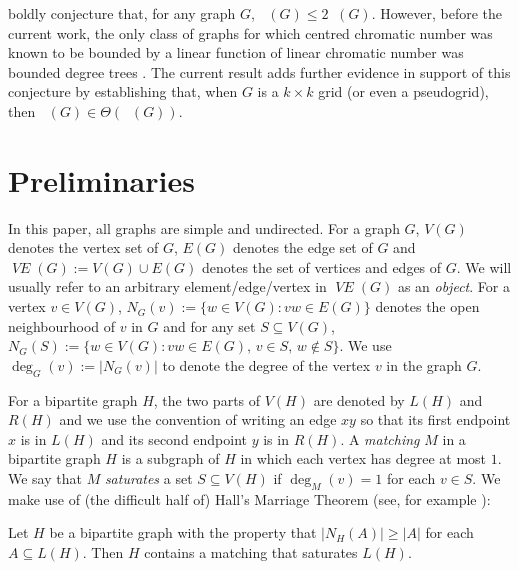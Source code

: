\documentclass{patmorin}
\newcommand{\defin}[1]{\emph{\color{brightmaroon}#1}}
\DeclareMathOperator{\chicen}{\chi_{\mathrm{cen}}}
\DeclareMathOperator{\chilin}{\chi_{\mathrm{lin}}}
\DeclareMathOperator{\VE}{\mathit{VE}}
\begin{document}

\citet{kun.obrien.ea:polynomial} boldly conjecture that, for any graph $G$, $\chicen(G)\le 2\chilin(G)$.  However, before the current work, the only class of graphs for which centred chromatic number was known to be bounded by a linear function of linear chromatic number was bounded degree trees \cite[Theorem~4]{kun.obrien.ea:polynomial}.  The current result adds further evidence in support of this conjecture by establishing that, when $G$ is a $k\times k$ grid (or even a pseudogrid), then $\chicen(G)\in\Theta(\chilin(G))$.

\section{Preliminaries}

In this paper, all graphs are simple and undirected. For a graph $G$, $V(G)$ denotes the vertex set of $G$, $E(G)$ denotes the edge set of $G$ and $\VE(G):=V(G)\cup E(G)$ denotes the set of vertices and edges of $G$. We will usually refer to an arbitrary element/edge/vertex in $\VE(G)$ as an \defin{object}. For a vertex $v\in V(G)$,  $N_G(v):=\{w\in V(G):vw\in E(G)\}$  denotes the open neighbourhood of $v$ in $G$ and for any set $S\subseteq V(G)$, $N_G(S):=\{w\in V(G):vw\in E(G),\, v\in S,\, w\not\in S\}$.  We use $\deg_G(v):=|N_G(v)|$ to denote the degree of the vertex $v$ in the graph $G$.

For a  bipartite graph $H$, the two parts of $V(H)$ are denoted by $L(H)$ and $R(H)$ and we use the convention of writing an edge $xy$ so that its first endpoint $x$ is in $L(H)$ and its second endpoint $y$ is in $R(H)$.  A \defin{matching} $M$ in a bipartite graph $H$ is a subgraph of $H$ in which each vertex has degree at most $1$.  We say that $M$ \defin{saturates} a set $S\subseteq V(H)$ if $\deg_M(v)=1$ for each $v\in S$.  We make use of (the difficult half of) Hall's Marriage Theorem (see, for example \citet[Theorem~2.1.2]{diestel:graph}):

\begin{thm}\label{hall}
  Let $H$ be a bipartite graph with the property that $|N_H(A)|\ge |A|$ for each $A\subseteq L(H)$.  Then $H$ contains a matching that saturates $L(H)$.
\end{thm}
\end{document}
